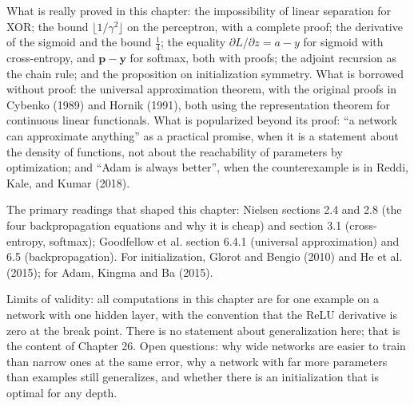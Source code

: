 \begin{untukpeneliti}
What is really proved in this chapter: the impossibility of linear separation for XOR; the bound
$\lfloor1/\gamma^{2}\rfloor$ on the perceptron, with a complete proof; the derivative of the
sigmoid and the bound $\tfrac14$; the equality $\partial L/\partial z=a-y$ for sigmoid with
cross-entropy, and $\mathbf{p}-\mathbf{y}$ for softmax, both with proofs; the adjoint recursion as
the chain rule; and the proposition on initialization symmetry. What is borrowed without proof:
the universal approximation theorem, with the original proofs in Cybenko (1989) and Hornik
(1991), both using the representation theorem for continuous linear functionals. What is
popularized beyond its proof: ``a network can approximate anything'' as a practical promise, when
it is a statement about the density of functions, not about the reachability of parameters by
optimization; and ``Adam is always better'', when the counterexample is in Reddi, Kale, and Kumar
(2018).

The primary readings that shaped this chapter: Nielsen sections 2.4 and 2.8 (the four
backpropagation equations and why it is cheap) and section 3.1 (cross-entropy, softmax);
Goodfellow et al. section 6.4.1 (universal approximation) and 6.5 (backpropagation). For
initialization, Glorot and Bengio (2010) and He et al. (2015); for Adam, Kingma and Ba (2015).

Limits of validity: all computations in this chapter are for one example on a network with one
hidden layer, with the convention that the ReLU derivative is zero at the break point. There is no
statement about generalization here; that is the content of Chapter 26. Open questions:
why wide networks are easier to train than narrow ones at the same error, why a network with far
more parameters than examples still generalizes, and whether there is an initialization that is
optimal for any depth.
\end{untukpeneliti}

